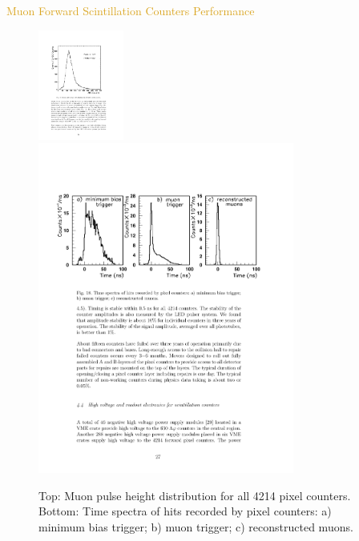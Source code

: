 \begin{frame}{\textcolor{Goldenrod}{Muon Forward Scintillation
      Counters Performance}}
  \begin{overlayarea}{\textwidth}{\textheight}
    \begin{figure}[h]
      \centering
      \includegraphics[width=0.25\textwidth]{./Images/47_MD_forward_pixels_05.pdf}\\
      \includegraphics[width=0.75\textwidth]{./Images/47_MD_forward_pixels_06.pdf}
      \caption*{{\scriptsize Top: Muon pulse height distribution for all 4214 pixel
        counters. Bottom: Time spectra of hits recorded by pixel
        counters: a) minimum bias trigger; b) muon trigger; c)
        reconstructed muons.}}
    \end{figure}
  \end{overlayarea}
\end{frame}


